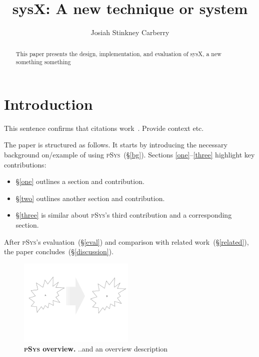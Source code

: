 \documentclass[sigplan, review, screen, 10pt]{acmart}
\title{sysX: A new technique or system}
\author{Josiah Stinkney Carberry}
\affiliation{Brown University}
\newcommand{\sx}[1]{(\S\ref{#1})}
\newcommand{\sys}{{\scshape pSys}\xspace}
\begin{document}
\begin{abstract}
This paper presents the design, implementation, and evaluation of sysX, a new something something
\end{abstract}

\maketitle


\section{Introduction}
\label{intro}

This sentence confirms that citations work~\cite{kpn74, dryad07}. Provide
context etc.

The paper is structured as follows.
It starts by introducing the necessary background on/example of using \sys~\sx{bg}.
Sections \ref{one}--\ref{three} highlight key contributions:
\begin{itemize}
	\item
	\S\ref{one}
		outlines a section and contribution.

	\item
	\S\ref{two} outlines another section and contribution.

	\item
	\S\ref{three} is similar about \sys's third contribution and a corresponding section.

\end{itemize}

\noindent
After \sys's evaluation~\sx{eval} and  comparison with related work~\sx{related}, the paper concludes~\sx{discussion}.  

\begin{figure}[t]
\centering
\includegraphics[width=0.49\textwidth]{./figs/cs2952r.pdf}
\caption{
  \textbf{\sys overview.}
  ..and an overview description
}
\vspace{-18pt}
\label{fig:overview}
\end{figure}
\end{document}
